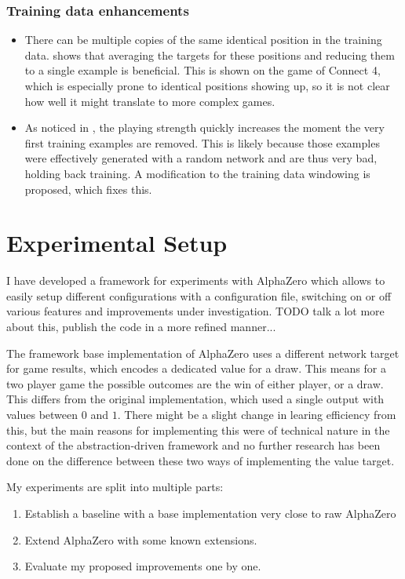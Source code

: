 \documentclass[12pt,onecolumn,oneside,titlepage]{article}
\begin{document}
\subsubsection{Training data enhancements}
\begin{itemize}
 \item There can be multiple copies of the same identical position in the training data. \cite{oracledevs6} shows that averaging the targets for these positions and reducing them to a single example is beneficial. This is shown on the game of Connect 4,
 which is especially prone to identical positions showing up, so it is not clear how well it might translate to more complex games.
 \item As noticed in \cite{oracledevs6}, the playing strength quickly increases the moment the very first training examples are removed. This is likely because those examples were effectively generated with a random network and are thus very bad, holding back training.
 A modification to the training data windowing is proposed, which fixes this.
\end{itemize}





\section{Experimental Setup} \label{s:experiments}

I have developed a framework for experiments with AlphaZero which allows to easily setup different configurations with a configuration file, switching on or off various features and improvements under investigation.
TODO talk a lot more about this, publish the code in a more refined manner...

The framework base implementation of AlphaZero uses a different network target for game results, which encodes a dedicated value for a draw. This means for a two player game the possible outcomes are the win of either player, or a draw.
This differs from the original implementation, which used a single output with values between $0$ and $1$.
There might be a slight change in learing efficiency from this, but the main reasons for implementing this were of technical nature in the context of the abstraction-driven framework
and no further research has been done on the difference between these two ways of implementing the value target.

My experiments are split into multiple parts:
\begin{enumerate}
 \item Establish a baseline with a base implementation very close to raw AlphaZero
 \item Extend AlphaZero with some known extensions.
 \item Evaluate my proposed improvements one by one.
\end{enumerate}
\end{document}
